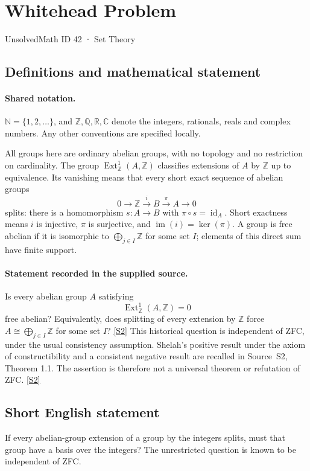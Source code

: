 \documentclass[11pt]{article}
\newcommand{\sref}[2]{\hyperlink{source:#1:#2}{[S#2]}}
\begin{document}
\setcounter{section}{41}
\section{Whitehead Problem}\label{42}
{\small\sffamily UnsolvedMath ID 42 · Set Theory}
\subsection{Definitions and mathematical statement}

\paragraph{Shared notation.}$\mathbb N=\{1,2,\ldots\}$, and $\mathbb Z,\mathbb Q,\mathbb R,\mathbb C$ denote the integers, rationals, reals and complex numbers. Any other conventions are specified locally.


All groups here are ordinary abelian groups, with no topology and no restriction on cardinality. The group $\operatorname{Ext}^1_{\mathbb Z}(A,\mathbb Z)$ classifies extensions of $A$ by $\mathbb Z$ up to equivalence. Its vanishing means that every short exact sequence of abelian groups
\[
 0\longrightarrow\mathbb Z\xrightarrow{i}B\xrightarrow{\pi}A\longrightarrow0
\]
splits: there is a homomorphism $s:A\to B$ with $\pi\circ s=\operatorname{id}_A$. Short exactness means $i$ is injective, $\pi$ is surjective, and $\operatorname{im}(i)=\ker(\pi)$. A group is free abelian if it is isomorphic to $\bigoplus_{j\in I}\mathbb Z$ for some set $I$; elements of this direct sum have finite support.
\paragraph{Statement recorded in the supplied source.}
Is every abelian group $A$ satisfying
\[
 \operatorname{Ext}^1_{\mathbb Z}(A,\mathbb Z)=0
\]
free abelian? Equivalently, does splitting of every extension by $\mathbb Z$ force $A\cong\bigoplus_{j\in I}\mathbb Z$ for some set $I$? \sref{42}{2}
This historical question is independent of ZFC, under the usual consistency assumption. Shelah's positive result under the axiom of constructibility and a consistent negative result are recalled in Source~S2, Theorem 1.1. The assertion is therefore not a universal theorem or refutation of ZFC. \sref{42}{2}
\subsection{Short English statement}
If every abelian-group extension of a group by the integers splits, must that group have a basis over the integers? The unrestricted question is known to be independent of ZFC.
\end{document}

